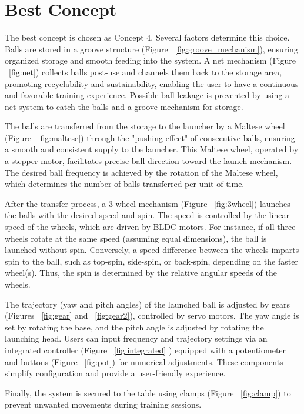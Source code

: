 \documentclass[12pt]{article}
\begin{document}
\section{Best Concept}

\begin{minipage}{0.7\textwidth}

The best concept is chosen as Concept 4. Several factors determine this choice. Balls are stored in a groove structure (Figure ~\ref{fig:groove_mechanism}), ensuring organized storage and smooth feeding into the system. A net mechanism (Figure ~\ref{fig:net}) collects balls post-use and channels them back to the storage area, promoting recyclability and sustainability, enabling the user to have a continuous and favorable training experience. Possible ball leakage is prevented by using a net system to catch the balls and a groove mechanism for storage.

The balls are transferred from the storage to the launcher by a Maltese wheel (Figure ~\ref{fig:maltese}) through the "pushing effect" of consecutive balls, ensuring a smooth and consistent supply to the launcher. This Maltese wheel, operated by a stepper motor, facilitates precise ball direction toward the launch mechanism. The desired ball frequency is achieved by the rotation of the Maltese wheel, which determines the number of balls transferred per unit of time.

After the transfer process, a 3-wheel mechanism (Figure ~\ref{fig:3wheel}) launches the balls with the desired speed and spin. The speed is controlled by the linear speed of the wheels, which are driven by BLDC motors. For instance, if all three wheels rotate at the same speed (assuming equal dimensions), the ball is launched without spin. Conversely, a speed difference between the wheels imparts spin to the ball, such as top-spin, side-spin, or back-spin, depending on the faster wheel(s). Thus, the spin is determined by the relative angular speeds of the wheels.

The trajectory (yaw and pitch angles) of the launched ball is adjusted by gears (Figures ~\ref{fig:gear} and ~\ref{fig:gear2}), controlled by servo motors. The yaw angle is set by rotating the base, and the pitch angle is adjusted by rotating the launching head. Users can input frequency and trajectory settings via an integrated controller (Figure ~\ref{fig:integrated} ) equipped with a potentiometer and buttons (Figure ~\ref{fig:pot}) for numerical adjustments. These components simplify configuration and provide a user-friendly experience.

Finally, the system is secured to the table using clamps (Figure ~\ref{fig:clamp}) to prevent unwanted movements during training sessions.
\end{minipage}%
\end{document}
